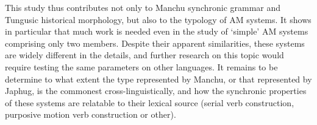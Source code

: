 \documentclass{article}
\begin{document}
This study thus contributes not only to Manchu synchronic grammar and Tungusic historical morphology, but also to the typology of AM systems. It shows in particular that much work is needed even in the study of `simple' AM systems comprising only two members. Despite their apparent similarities, these systems are widely different in the details, and further research on this topic would require testing the same parameters on other languages. It remains to be determine to what extent the type represented by Manchu, or that represented by Japhug, is the commonest cross-linguistically, and how the synchronic properties of these systems are relatable to their lexical source (serial verb construction, purposive motion verb construction or other).




 
\end{document}
